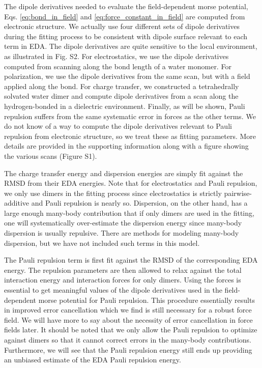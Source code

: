 \documentclass[journal=jacsat,manuscript=article]{achemso}
\begin{document}
The dipole derivatives needed to evaluate the field-dependent morse potential, Eqs. \ref{eq:bond_in_field} and \ref{eq:force_constant_in_field}
are computed from electronic structure. We actually use four different sets of dipole derivatives
during the fitting process to be consistent with dipole surface relevant to each term in EDA.
The dipole derivatives are quite sensitive to the local environment, as illustrated in Fig. S2.
For electrostatics, we use the dipole derivatives computed from scanning along the 
bond length of a water monomer. For polarization, we use the dipole derivatives from
the same scan, but with a field applied along the  bond. For charge transfer,
we constructed a tetrahedrally solvated water dimer and compute dipole derivatives from a
scan along the hydrogen-bonded  in a dielectric environment. Finally, as will be shown,
Pauli repulsion suffers from the same systematic error in forces as the other terms. We do not
know of a way to compute the dipole derivatives relevant to Pauli repulsion from electronic
structure, so we treat these as fitting parameters. More details are provided
in the supporting information along with a figure showing the various scans (Figure S1).

The charge transfer energy and dispersion energies are simply fit against the RMSD
from their EDA energies. Note that for electrostatics and Pauli repulsion, we only use dimers in
the fitting process since electrostatics is strictly pairwise-additive and Pauli repulsion is nearly so.
Dispersion, on the other hand, has a large enough many-body contribution that if only dimers
are used in the fitting, one will systematically over-estimate the dispersion energy since
many-body dispersion is usually repulsive. There are methods for modeling many-body dispersion,
but we have not included such terms in this model.\cite{anatole2010two,van2018new}

The Pauli repulsion term is first fit against the RMSD of the corresponding EDA energy.
The repulsion parameters are then allowed to relax against the total interaction energy
and interaction forces for only dimers. Using the forces is essential to get meaningful
values of the dipole derivatives used in the field-dependent morse potential for Pauli
repulsion. This procedure essentially results in improved error cancellation
which we find is still necessary for a robust force field. We will have more to say about the necessity
of error cancellation in force fields later. It should be noted that we only allow
the Pauli repulsion to optimize against dimers so that it cannot correct errors
in the many-body contributions. Furthermore, we will see that the Pauli repulsion energy
still ends up providing an unbiased estimate of the EDA Pauli repulsion energy.
\end{document}
